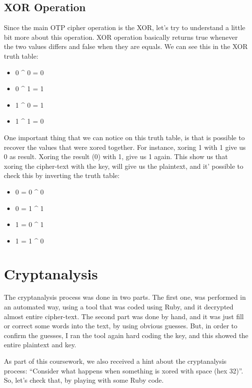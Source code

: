 \documentclass[journal]{IEEEtran}
\begin{document}
\subsection{XOR Operation}
Since the main OTP cipher operation is the XOR, let’s try to understand a little bit more about this operation. XOR operation basically returns true whenever the two values differs and false when they are equals. We can see this in the XOR truth table:

\begin{itemize}
	\item 0 \textasciicircum{} 0 = 0
	\item 0 \textasciicircum{} 1 = 1
	\item 1 \textasciicircum{} 0 = 1
	\item 1 \textasciicircum{} 1 = 0
\end{itemize}

One important thing that we can notice on this truth table, is that is possible to recover the values that were xored together. For instance, xoring 1 with 1 give us 0 as result. Xoring the result (0) with 1, give us 1 again. This show us that xoring the cipher-text with the key, will give us the plaintext, and it’ possible to check this by inverting the truth table:

\begin{itemize}
	\item 0 = 0 \textasciicircum{} 0
	\item 0 = 1 \textasciicircum{} 1
	\item 1 = 0 \textasciicircum{} 1
	\item 1 = 1 \textasciicircum{} 0
\end{itemize}

\section{Cryptanalysis}

The cryptanalysis process was done in two parts. The first one, was performed in an automated way, using a tool that was coded using Ruby, and it decrypted almost entire cipher-text. The second part was done by hand, and it was just fill or correct some words into the text, by using obvious guesses. But, in order to confirm the guesses, I ran the tool again hard coding the key, and this showed the entire plaintext and key.

As part of this coursework, we also received a hint about the cryptanalysis process: “Consider what happens when something is xored with space (hex 32)”. So, let’s check that, by playing with some Ruby code.
\end{document}

